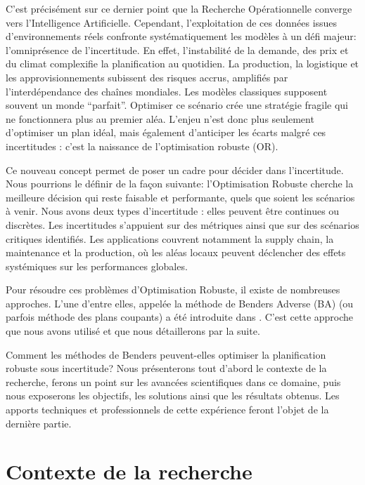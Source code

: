 \documentclass[12pt, a4paper, twoside]{report}
\numberwithin{equation}{section}
\begin{document}
	C'est précisément sur ce dernier point que la Recherche Opérationnelle converge vers l'Intelligence Artificielle. Cependant, l'exploitation de ces données issues d'environnements réels confronte systématiquement les modèles à un défi majeur: l'omniprésence de l'incertitude.
	En effet, l'instabilité de la demande, des prix et du climat complexifie la planification au quotidien. La production, la logistique et les approvisionnements subissent des risques accrus, amplifiés par l'interdépendance des chaînes mondiales.
	Les modèles classiques supposent souvent un monde \enquote{parfait}. Optimiser ce scénario crée une stratégie fragile qui ne fonctionnera plus au premier aléa. L'enjeu n'est donc plus seulement d'optimiser un plan idéal, mais également d'anticiper les écarts malgré ces incertitudes : c'est la naissance de l'optimisation robuste (OR).
	
	Ce nouveau concept permet de poser un cadre pour décider dans l'incertitude. Nous pourrions le définir de la façon suivante: l'Optimisation Robuste cherche la meilleure décision qui reste faisable et performante, quels que soient les scénarios à venir.
	Nous avons deux types d'incertitude : elles peuvent être continues ou discrètes. Les incertitudes s'appuient sur des métriques ainsi que sur des scénarios critiques identifiés.
	Les applications couvrent notamment la supply chain, la maintenance et la production, où les aléas locaux peuvent déclencher des effets systémiques sur les performances globales.
	
	Pour résoudre ces problèmes d'Optimisation Robuste, il existe de nombreuses approches. L'une d'entre elles, appelée la méthode de Benders Adverse (BA) (ou parfois méthode des plans coupants) a été introduite dans \cite{Mutapcic01062009}. C'est cette approche que nous avons utilisé et que nous détaillerons par la suite.
	
	Comment les méthodes de Benders peuvent-elles optimiser la planification robuste sous incertitude?
	Nous présenterons tout d'abord le contexte de la recherche, ferons un point sur les avancées scientifiques dans ce domaine, puis nous exposerons les objectifs, les solutions ainsi que les résultats obtenus. Les apports techniques et professionnels de cette expérience feront l’objet de la dernière partie.
	
	
	\clearpage
	\section{Contexte de la recherche}
	
\end{document}
